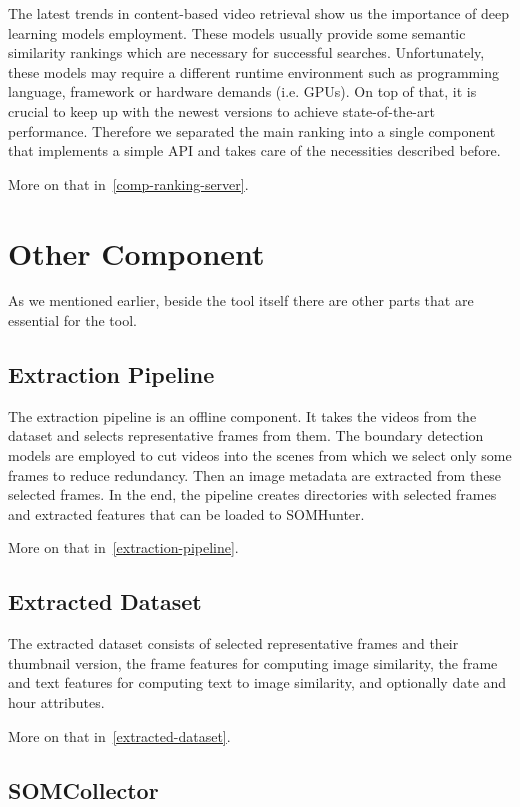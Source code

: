 The latest trends in content-based video retrieval show us the importance of deep learning models employment. These models usually provide some semantic similarity rankings which are necessary for successful searches. Unfortunately, these models may require a different runtime environment such as programming language, framework or hardware demands (i.e. GPUs). On top of that, it is crucial to keep up with the newest versions to achieve state-of-the-art performance. Therefore we separated the main ranking into a single component that implements a simple API and takes care of the necessities described before.

More on that in~\cref{comp-ranking-server}.


\section{Other Component}
As we mentioned earlier, beside the tool itself there are other parts that are essential for the tool.

\subsection{Extraction Pipeline}

The extraction pipeline is an offline component. It takes the videos from the dataset and selects representative frames from them. The boundary detection models are employed to cut videos into the scenes from which we select only some frames to reduce redundancy. Then an image metadata are extracted from these selected frames. In the end, the pipeline creates directories with selected frames and extracted features that can be loaded to SOMHunter.

More on that in~\cref{extraction-pipeline}.

\subsection{Extracted Dataset}

The extracted dataset consists of selected representative frames and their thumbnail version, the frame features for computing image similarity, the frame and text features for computing text to image similarity, and optionally date and hour attributes.

More on that in~\cref{extracted-dataset}.

\subsection{SOMCollector}

